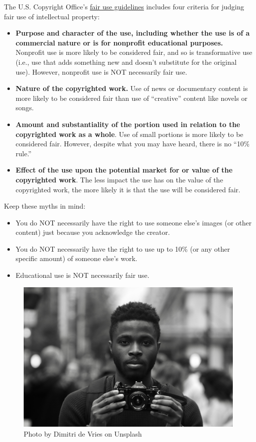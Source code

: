 \documentclass[]{book}
\providecommand{\tightlist}{%
  \setlength{\itemsep}{0pt}\setlength{\parskip}{0pt}}
\theoremstyle{definition}
\theoremstyle{definition}
\theoremstyle{definition}
\theoremstyle{remark}
\begin{document}
The U.S. Copyright Office's
\href{https://www.copyright.gov/fair-use/more-info.html}{fair use
guidelines} includes four criteria for judging fair use of intellectual
property:

\begin{itemize}
\tightlist
\item
  \textbf{Purpose and character of the use, including whether the use is
  of a commercial nature or is for nonprofit educational purposes.}
  Nonprofit use is more likely to be considered fair, and so is
  transformative use (i.e., use that adds something new and doesn't
  substitute for the original use). However, nonprofit use is NOT
  necessarily fair use.
\item
  \textbf{Nature of the copyrighted work.} Use of news or documentary
  content is more likely to be considered fair than use of ``creative''
  content like novels or songs.
\item
  \textbf{Amount and substantiality of the portion used in relation to
  the copyrighted work as a whole}. Use of small portions is more likely
  to be considered fair. However, despite what you may have heard, there
  is no ``10\% rule.''
\item
  \textbf{Effect of the use upon the potential market for or value of
  the copyrighted work}. The less impact the use has on the value of the
  copyrighted work, the more likely it is that the use will be
  considered fair.
\end{itemize}

Keep these myths in mind:

\begin{itemize}
\tightlist
\item
  You do NOT necessarily have the right to use someone else's images (or
  other content) just because you acknowledge the creator.
\item
  You do NOT necessarily have the right to use up to 10\% (or any other
  specific amount) of someone else's work.
\item
  Educational use is NOT necessarily fair use.
\end{itemize}

\begin{figure}
\centering
\includegraphics{dimitri-de-vries.jpg}
\caption{Photo by Dimitri de Vries on Unsplash}
\end{figure}
\end{document}

